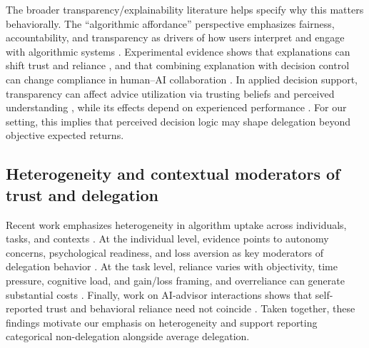 \documentclass[a4paper, 12pt, fleqn]{article}
\theoremstyle{definition}
\begin{document}
The broader transparency/explainability literature helps specify why this matters behaviorally. The ``algorithmic affordance'' perspective emphasizes fairness, accountability, and transparency as drivers of how users interpret and engage with algorithmic systems \citep{Shin2019}. Experimental evidence shows that explanations can shift trust and reliance \citep{Leichtmann2023}, and that combining explanation with decision control can change compliance in human--AI collaboration \citep{Westphal2023}. In applied decision support, transparency can affect advice utilization via trusting beliefs and perceived understanding \citep{Ning2024}, while its effects depend on experienced performance \citep{Sun2026}. For our setting, this implies that perceived decision logic may shape delegation beyond objective expected returns.

\subsection{Heterogeneity and contextual moderators of trust and delegation}
Recent work emphasizes heterogeneity in algorithm uptake across individuals, tasks, and contexts \citep{Ferraz2025,Yang2025}. At the individual level, evidence points to autonomy concerns, psychological readiness, and loss aversion as key moderators of delegation behavior \citep{Fink2024,Kim2026,Werner2026}. At the task level, reliance varies with objectivity, time pressure, cognitive load, and gain/loss framing, and overreliance can generate substantial costs \citep{Yang2025,Klingbeil2024,Werner2026}. Finally, work on AI-advisor interactions shows that self-reported trust and behavioral reliance need not coincide \citep{Schreibelmayr2025}. Taken together, these findings motivate our emphasis on heterogeneity and support reporting categorical non-delegation alongside average delegation.
\end{document}
